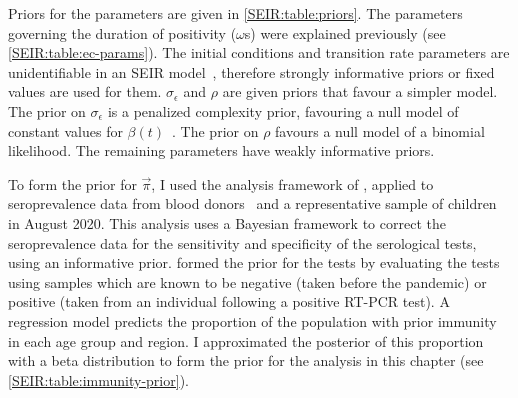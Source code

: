 \documentclass[thesis.tex]{subfiles}
\begin{document}
Priors for the parameters are given in \cref{SEIR:table:priors}.
The parameters governing the duration of positivity ($\omega$s) were explained previously (see \cref{SEIR:table:ec-params}).
The initial conditions and transition rate parameters are unidentifiable in an SEIR model~\autocite{dankwaStructural}, therefore strongly informative priors or fixed values are used for them.
$\sigma_\epsilon$ and $\rho$ are given priors that favour a simpler model.
The prior on $\sigma_\epsilon$ is a penalized complexity prior, favouring a null model of constant values for $\beta(t)$~\autocite{simpsonPenalising}.
The prior on $\rho$ favours a null model of a binomial likelihood.
The remaining parameters have weakly informative priors.

To form the prior for $\vec{\pi}$, I used the analysis framework of \textcite{amirthalingamSeroprevalence}, applied to seroprevalence data from blood donors~\autocite{amirthalingamSeroprevalence} and a representative sample of children~\autocite{ratcliffeCommunity} in August 2020.
This analysis uses a Bayesian framework to correct the seroprevalence data for the sensitivity and specificity of the serological tests, using an informative prior.
\Textcite{amirthalingamSeroprevalence} formed the prior for the tests by evaluating the tests using samples which are known to be negative (taken before the pandemic) or positive (taken from an individual following a positive RT-PCR test).
A regression model predicts the proportion of the population with prior immunity in each age group and region.
I approximated the posterior of this proportion with a beta distribution to form the prior for the analysis in this chapter (see \cref{SEIR:table:immunity-prior}).
\end{document}
